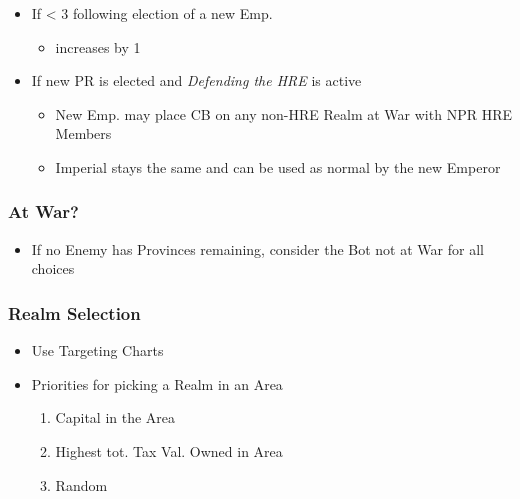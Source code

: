 \documentclass[10pt]{article}
\begin{document}
\begin{itemize}
\begin{itemize}
	\end{itemize}
	\item If \authority < 3 following election of a new Emp.
	\begin{itemize}
		\item \authority increases by 1
	\end{itemize}
	\item If new PR is elected and \emph{Defending the HRE} is active
	\begin{itemize}
		\item New Emp. may place CB on any non-HRE Realm at War with NPR HRE Members
		\item Imperial \manpower stays the same and can be used as normal by the new Emperor
	\end{itemize}
\end{itemize}


\botrules %

\subsubsection*{At War?}
\begin{itemize}
	\item If no Enemy has Provinces remaining, consider the Bot not at War for all choices
\end{itemize}

\subsubsection*{Realm Selection}
\begin{itemize}
	\item Use Targeting Charts
	\item Priorities for picking a Realm in an Area
	\begin{enumerate}
		\item Capital in the Area
		\item Highest tot. Tax Val. Owned in Area
		\item Random
	\end{enumerate}
\end{itemize}
\end{document}
